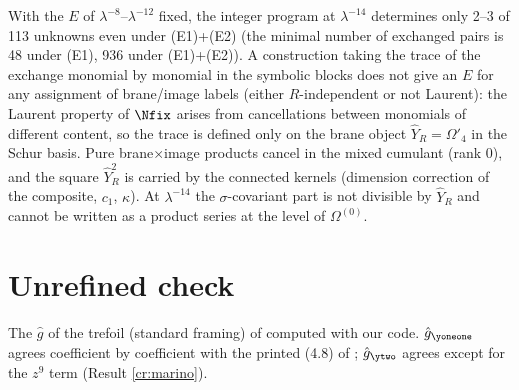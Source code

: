 \begin{result}\label{cr:n2negative}
With the $E$ of $\lambda^{-8}$--$\lambda^{-12}$ fixed, the integer program at $\lambda^{-14}$ determines only 2--3 of 113 unknowns even under (E1)+(E2) (the minimal number of exchanged pairs is 48 under (E1), 936 under (E1)+(E2)). A construction taking the trace of the exchange monomial by monomial in the symbolic blocks does not give an $E$ for any assignment of brane/image labels (either $R$-independent or not Laurent): the Laurent property of $\Nfix$ arises from cancellations between monomials of different content, so the trace is defined only on the brane object $\hat Y_R = \Omega'_4$ in the Schur basis. Pure brane$\times$image products cancel in the mixed cumulant (rank 0), and the square $\hat Y_R^2$ is carried by the connected kernels (dimension correction of the composite, $c_1$, $\kappa$). At $\lambda^{-14}$ the $\sigma$-covariant part is not divisible by $\hat Y_R$ and cannot be written as a product series at the level of $\Omega^{(0)}$.
\end{result}

\section{Unrefined check}\label{app:unref}
The $\hat g$ of the trefoil (standard framing) of \cite{Marino09} computed with our code. $\hat g_{\yoneone}$ agrees coefficient by coefficient with the printed (4.8) of \cite{Marino09}; $\hat g_{\ytwo}$ agrees except for the $z^9$ term (Result \ref{cr:marino}).

